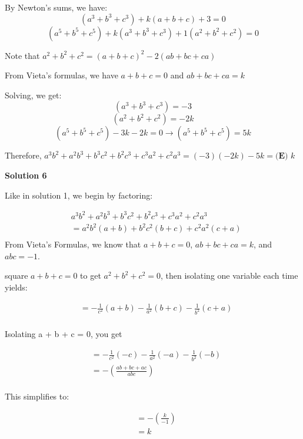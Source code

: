 \begin{enumerate}
 By Newton's sums, we have:
 \[(a^3 + b^3 + c^3) + k(a+b+c) + 3 = 0\]
 \[(a^5 + b^5 + c^5) + k(a^3+b^3+c^3) + 1(a^2+b^2+c^2) = 0\]

 Note that $a^2+b^2+c^2 = (a+b+c)^2 - 2(ab+bc+ca)$

 From Vieta's formulas, we have $a+b+c = 0$ and $ab + bc + ca = k$

 Solving, we get:
 \[(a^3 + b^3 + c^3) = -3\]
 \[(a^2 + b^2 + c^2) = -2k\]
 \[(a^5 + b^5 + c^5) - 3k - 2k = 0 \to (a^5 + b^5 + c^5) = 5k\]

 Therefore, $a^3b^2+a^2b^3+b^3c^2+b^2c^3+c^3a^2+c^2a^3 = (-3)(-2k)-5k = \boxed{\textbf{(E) }k}$




\textbf{Solution 6}

Like in solution 1, we begin by factoring:

 \begin{equation}\begin{split}&a^3b^2+a^2b^3+b^3c^2+b^2c^3+c^3a^2+c^2a^3 \\&=a^2b^2(a+b)+b^2c^2(b+c)+c^2a^2(c+a)\\\end{split}\end{equation}From Vieta's Formulas, we know that $a+b+c = 0$, $ab+bc+ca = k$, and $abc = -1$. 

 square $a+b+c = 0$ to get $a^2 + b^2 + c^2 = 0$, then isolating one variable each time yields:

 \begin{equation}\begin{split}&=-\frac{1}{c^2}(a+b)-\frac{1}{a^2}(b+c)-\frac{1}{b^2}(c+a)\\\end{split}\end{equation}

 Isolating a + b + c = 0, you get

 \begin{equation}\begin{split}&=-\frac{1}{c^2}(-c)-\frac{1}{a^2}(-a)-\frac{1}{b^2}(-b)\\&=-(\frac{ab+bc+ac}{abc})\\\end{split}\end{equation}

 This simplifies to:

 \begin{equation}\begin{split}&=-(\frac{k}{-1})\\&=k\end{split}\end{equation}


\end{enumerate}
